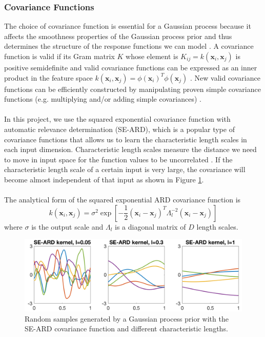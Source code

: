 \documentclass[a4paper,11pt]{report}
\begin{document}
\subsubsection{Covariance Functions}
The choice of covariance function is essential for a Gaussian process because it affects the smoothness properties of the Gaussian process prior \cite{brochu2010tutorial} and thus determines the structure of the response functions we can model \cite{shahriari2016taking}. A covariance function is valid if its Gram matrix $K$ whose element is $K_{ij}=k(\mathbf{x}_i,\mathbf{x}_j)$ is positive semidefinite and valid covariance functions can be expressed as an inner product  in the feature space $k(\mathbf{x}_i,\mathbf{x}_j)=\phi(\mathbf{x}_i)^T\phi(\mathbf{x}_j)$ \cite{bishop2006pattern}. New valid covariance functions can be efficiently constructed by manipulating proven simple covariance functions (e.g. multiplying and/or adding simple covariances) \cite{rasmussen2006gaussian}. 
\\\\
In this project, we use the squared exponential covariance function with automatic relevance determination  (SE-ARD), which is a popular type of covariance functions that allows us to learn the characteristic length scales in each input dimension. Characteristic length scales measure the distance we need to move in input space for the function values to be uncorrelated \cite{rasmussen2006gaussian}. If the characteristic length scale of a certain input is very large,  the covariance will become almost independent of that input as shown in Figure \ref{seard}.
\\\\
The analytical form of the squared exponential ARD covariance function is 
\begin{equation}
 k(\mathbf{x}_i,\mathbf{x}_j)=\sigma^2 \exp \left[-\frac{1}{2}(\mathbf{x}_i-\mathbf{x}_j)^T \Lambda_l^{-2} (\mathbf{x}_i-\mathbf{x}_j) \right]
 \end{equation}
where $\sigma$ is the output scale  and $\Lambda_l$ is a diagonal matrix of $D$ length scales. 
\\
\begin{figure} [H]
	\label{seard}
	\centering
	 \includegraphics[width=0.8\linewidth]{SEARDprior.png}
\caption{ Random samples generated by a Gaussian process prior with the SE-ARD covariance function and different characteristic lengths.}
\end{figure}
\noindent 
\end{document}
